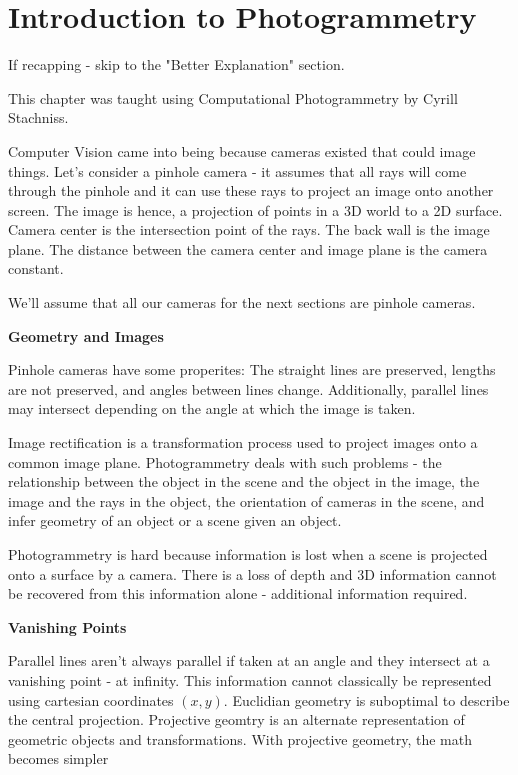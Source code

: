 \chapter{Introduction to Photogrammetry}

If recapping - skip to the "Better Explanation" section.

This chapter was taught using Computational Photogrammetry by Cyrill Stachniss.

Computer Vision came into being because cameras existed that could image things. Let's consider a pinhole camera - it assumes that all rays will come through the pinhole and it can use these rays to project an image onto another screen. The image is hence, a projection of points in a 3D world to a 2D surface. Camera center is the intersection point of the rays. The back wall is the image plane. The distance between the camera center and image plane is the camera constant.

We'll assume that all our cameras for the next sections are pinhole cameras. 

\textbf{Geometry and Images}

Pinhole cameras have some properites: The straight lines are preserved, lengths are not preserved, and angles between lines change. Additionally, parallel lines may intersect depending on the angle at which the image is taken.

Image rectification is a transformation process used to project images onto a common image plane. Photogrammetry deals with such problems - the relationship between the object in the scene and the object in the image, the image and the rays in the object, the orientation of cameras in the scene, and infer geometry of an object or a scene given an object.

Photogrammetry is hard because information is lost when a scene is projected onto a surface by a camera. There is a loss of depth and 3D information cannot be recovered from this information alone - additional information required. 

\textbf{Vanishing Points}

Parallel lines aren't always parallel if taken at an angle and they intersect at a vanishing point - at infinity. This information cannot classically be represented using cartesian coordinates $(x, y)$. Euclidian geometry is suboptimal to describe the central projection. Projective geomtry is an alternate representation of geometric objects and transformations. With projective geometry, the math becomes simpler

